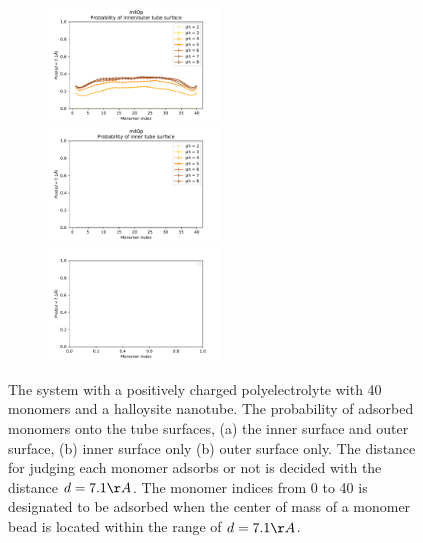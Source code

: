     \begin{figure}[h!]
      \centering
        \begin{subfigure}{\linewidth}
          \centering
            \includegraphics[width=0.5\textwidth]{fig/m40p-prob-io.pdf}  
            \includegraphics[width=0.5\textwidth]{fig/m40p-prob-i.pdf}
            \includegraphics[width=0.5\textwidth]{fig/m40p-prob-o.pdf}
            \end{subfigure}\par\medskip
     \caption{The system with a positively charged polyelectrolyte with 40 monomers and a halloysite nanotube. The probability of adsorbed monomers onto the tube surfaces, (a) the inner surface and outer surface, (b) inner surface only (b) outer surface only. The distance for judging each monomer adsorbs or not is decided with the distance $d = 7.1\AA$. The monomer indices from 0 to 40 is designated to be adsorbed when the center of mass of a monomer bead is located within the range of $d = 7.1\AA$. }
    \label{fig:m40p-prob} %
\end{figure}

\clearpage

